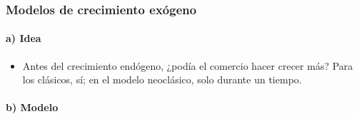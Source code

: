 \documentclass[11pt]{article}
\begin{document}
\subsubsection{Modelos de crecimiento exógeno}\label{sec:exogeno}

\paragraph{a) Idea}

\begin{itemize}
\item Antes del crecimiento endógeno, ¿podía el comercio hacer crecer más? Para los clásicos, sí; en el modelo neoclásico, solo durante un tiempo.
\end{itemize}

\paragraph{b) Modelo}
\end{document}
